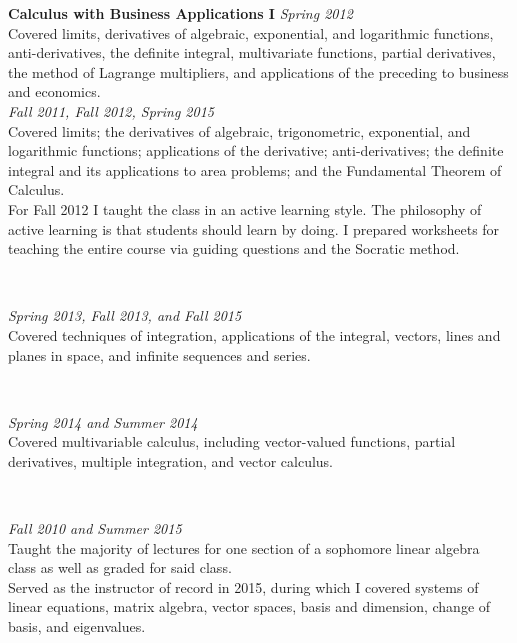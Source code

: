 \documentclass{article}
\begin{document}
\noindent\textbf{Calculus with Business Applications I} \hfill \textit{Spring 2012}\\
Covered limits, derivatives of algebraic, exponential, and logarithmic
functions, anti-derivatives, the definite integral, multivariate functions,
partial derivatives, the method of Lagrange multipliers, and applications of the
preceding to business and economics.
\\

 \hfill {\it Fall 2011, Fall 2012, Spring 2015}\\
Covered limits; the derivatives of algebraic, trigonometric, exponential, and
logarithmic functions; applications of the derivative; anti-derivatives; the
definite integral and its applications to area problems; and the Fundamental
Theorem of Calculus. \\ For Fall 2012 I taught the class in an active learning
style. The philosophy of active learning is that students should learn by
doing. I prepared worksheets for teaching the entire course via guiding
questions and the Socratic method.

\

 \hfill {\it Spring 2013, Fall 2013, and Fall 2015}\\
Covered techniques of integration, applications of the
integral, vectors, lines and planes in space, and infinite sequences
and series.  

\

 \hfill {\it Spring 2014 and Summer 2014}\\
Covered multivariable calculus, including vector-valued
functions, partial derivatives, multiple integration, and vector
calculus. 

\

 \hfill {\it Fall 2010 and Summer 2015}\\
Taught the majority of lectures for one section of a sophomore linear algebra
class as well as graded for said class.\\ Served as the instructor of record in
2015, during which I covered systems of linear equations, matrix algebra, vector
spaces, basis and dimension, change of basis, and eigenvalues.

\
\end{document}
